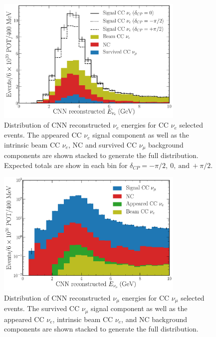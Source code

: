 \begin{figure} %
    \includegraphics[width=0.8\textwidth]{diagrams/7-results/final_nuel_passed_energy_dist.pdf}
    \caption[Distribution of CNN reconstructed $\nu_{e}$ energies for CC $\nu_{e}$ selected events]
    {Distribution of CNN reconstructed $\nu_{e}$ energies for CC $\nu_{e}$ selected events. The
        appeared CC $\nu_{e}$ signal component as well as the intrinsic beam CC $\nu_{e}$, NC and
        survived CC $\nu_{\mu}$ background components are shown stacked to generate the full
        distribution. Expected totals are show in each bin for
        $\delta_{CP}=-\pi/2,~0,~\mathrm{and}~+\pi/2$.}
    \label{fig:final_nuel_passed_energy_dist}
\end{figure}

\begin{figure} %
    \includegraphics[width=0.8\textwidth]{diagrams/7-results/final_numu_passed_energy_dist.pdf}
    \caption[Distribution of CNN reconstructed $\nu_{\mu}$ energies for CC $\nu_{\mu}$ selected events]
    {Distribution of CNN reconstructed $\nu_{\mu}$ energies for CC $\nu_{\mu}$ selected events.
        The survived CC $\nu_{\mu}$ signal component as well as the appeared CC $\nu_{e}$,
        intrinsic beam CC $\nu_{e}$, and NC background components are shown stacked to generate
        the full distribution.}
    \label{fig:final_numu_passed_energy_dist}
\end{figure}

